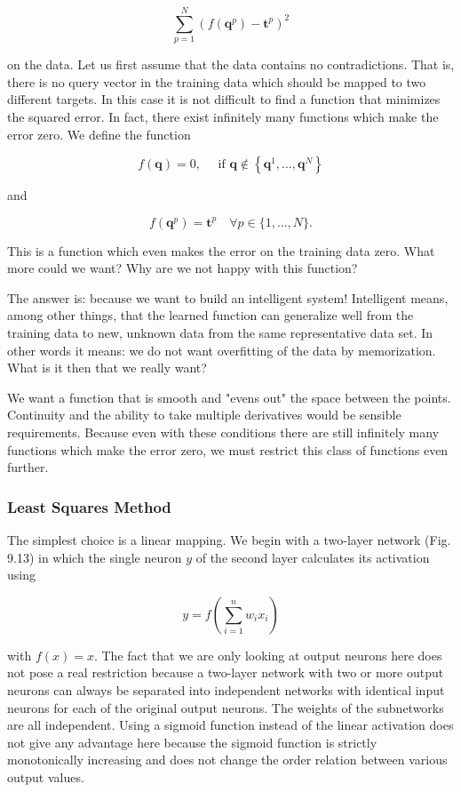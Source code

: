 \documentclass[10pt]{article}
\begin{document}
$$
\sum_{p=1}^{N}\left(f\left(\boldsymbol{q}^{p}\right)-\boldsymbol{t}^{p}\right)^{2}
$$

on the data. Let us first assume that the data contains no contradictions. That is, there is no query vector in the training data which should be mapped to two different targets. In this case it is not difficult to find a function that minimizes the squared error. In fact, there exist infinitely many functions which make the error zero. We define the function

$$
f(\boldsymbol{q})=0, \quad \text { if } \boldsymbol{q} \notin\left\{\boldsymbol{q}^{1}, \ldots, \boldsymbol{q}^{N}\right\}
$$

and

$$
f\left(\boldsymbol{q}^{p}\right)=\boldsymbol{t}^{p} \quad \forall p \in\{1, \ldots, N\} .
$$

This is a function which even makes the error on the training data zero. What more could we want? Why are we not happy with this function?

The answer is: because we want to build an intelligent system! Intelligent means, among other things, that the learned function can generalize well from the training data to new, unknown data from the same representative data set. In other words it means: we do not want overfitting of the data by memorization. What is it then that we really want?

We want a function that is smooth and "evens out" the space between the points. Continuity and the ability to take multiple derivatives would be sensible requirements. Because even with these conditions there are still infinitely many functions which make the error zero, we must restrict this class of functions even further.

\subsubsection*{Least Squares Method}
The simplest choice is a linear mapping. We begin with a two-layer network (Fig. 9.13) in which the single neuron $y$ of the second layer calculates its activation using

$$
y=f\left(\sum_{i=1}^{n} w_{i} x_{i}\right)
$$

with $f(x)=x$. The fact that we are only looking at output neurons here does not pose a real restriction because a two-layer network with two or more output neurons can always be separated into independent networks with identical input neurons for each of the original output neurons. The weights of the subnetworks are all independent. Using a sigmoid function instead of the linear activation does not give any advantage here because the sigmoid function is strictly monotonically increasing and does not change the order relation between various output values.
\end{document}
